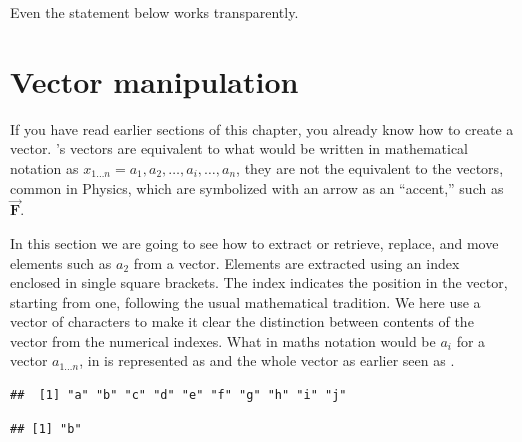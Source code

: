\documentclass[krantz2]{krantz}\usepackage{knitr}
\begin{document}
\begin{explainbox}
Even the statement below works transparently.

\begin{knitrout}\footnotesize
{}\color{fgcolor}\begin{kframe}
\begin{alltt}
\hlstd{a[}\hlstd{]} \hlkwb{<-} \hlstd{b[}\hlstd{]}
\end{alltt}
\end{kframe}
\end{knitrout}
\end{explainbox}


\section{Vector manipulation}\label{sec:vectors}\label{sec:calc:indexing}
If you have read earlier sections of this chapter, you already know how to create a vector. \Rlang's vectors are equivalent to what would be written in mathematical notation as $x_{1\ldots n} = a_1, a_2, \ldots, a_i, \ldots, a_n$, they are not the equivalent to the vectors, common in Physics, which are symbolized with an arrow as an ``accent,'' such as $\overrightarrow{\mathbf{F}}$.

In this section we are going to see how to extract or retrieve, replace, and move elements such as $a_2$ from a vector. Elements are extracted using an index enclosed in single square brackets. The index indicates the position in the vector, starting from one, following the usual mathematical tradition. We here use a vector of characters to make it clear the distinction between contents of the vector from the numerical indexes. What in maths notation would be $a_i$ for a vector $a_{1\ldots n}$, in \Rpgrm is represented as  and the whole vector as earlier seen as .

\begin{knitrout}\footnotesize
{}\color{fgcolor}\begin{kframe}
\begin{alltt}
 \hlkwb{<-} \hlstd{letters[}\hlopt{:}\hlstd{]}
\end{alltt}
\begin{verbatim}
##  [1] "a" "b" "c" "d" "e" "f" "g" "h" "i" "j"
\end{verbatim}
\begin{alltt}
\hlstd{a[}\hlstd{]}
\end{alltt}
\begin{verbatim}
## [1] "b"
\end{verbatim}
\end{kframe}
\end{knitrout}
\end{document}
